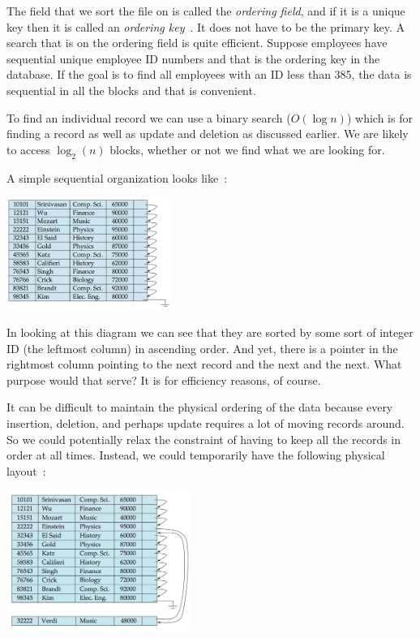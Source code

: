 The field that we sort the file on is called the \textit{ordering field}, and if it is a  unique key then it is called an \textit{ordering key}~\cite{fds}. It does not have to be the primary key. A search that is on the ordering field is quite efficient. Suppose employees have sequential unique employee ID numbers and that is the ordering key in the database. If the goal is to find all employees with an ID less than 385, the data is sequential in all the blocks and that is convenient.

To find an individual record we can use a binary search ($O(\log n)$) which is for finding a record as well as update and deletion as discussed earlier. We are likely to access $\log_{2}(n)$ blocks, whether or not we find what we are looking for.

A simple sequential organization looks like~\cite{dsc}:

\begin{center}
\includegraphics[width=0.4\textwidth]{images/sequential}
\end{center}

In looking at this diagram we can see that they are sorted by some sort of integer ID (the leftmost column) in ascending order. And yet, there is a pointer in the rightmost column pointing to the next record and the next and the next. What purpose would that serve? It is for efficiency reasons, of course. 

It can be difficult to maintain the physical ordering of the data because every insertion, deletion, and perhaps update requires a lot of moving records around. So we could potentially relax the constraint of having to keep all the records in order at all times. Instead, we could temporarily have the following physical layout~\cite{dsc}:

\begin{center}
\includegraphics[width=0.45\textwidth]{images/sequential-2}
\end{center}

